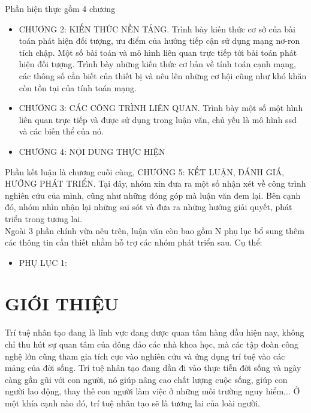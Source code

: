 \documentclass[a4paper]{report}
\begin{document}
Phần hiện thực gồm 4 chương\\
\begin{itemize}
	\item CHƯƠNG 2: KIẾN THỨC NỀN TẢNG. Trình bày kiến thức cơ sở của bài toán phát hiện
	 đối tượng, ưu điểm của hướng tiếp cận sử dụng mạng nơ-ron tích chập. Một số bài 
	 toán và mô hình liên quan trực tiếp tới bài toán phát hiện đối tượng. Trình bày 
	 những kiến thức cơ bản về tính toán cạnh mạng, các thông số cần biết của thiết bị
	  và nêu lên những cơ hội cũng như khó khăn còn tồn tại của tính toán mạng. 
	\item CHƯƠNG 3: CÁC CÔNG TRÌNH LIÊN QUAN. Trình bày một số một hình liên quan 
	trực tiếp và được sử dụng trong luận văn, chủ yếu là mô hình ssd và các biến thể 
	của nó.

	\item CHƯƠNG 4: NỘI DUNG THỰC HIỆN
\end{itemize}

Phần kết luận là chương cuối cùng, CHƯƠNG 5: KẾT LUẬN, ĐÁNH GIÁ, HƯỚNG PHÁT TRIỂN. Tại đây, nhóm xin đưa
ra một số nhận xét về công trình nghiên cứu của mình, cũng như những đóng góp mà luận
văn đem lại. Bên cạnh đó, nhóm nhìn nhận lại những sai sót và đưa ra những hướng giải
quyết, phát triển trong tương lai.\\

Ngoài 3 phần chính vừa nêu trên, luận văn còn bao gồm N phụ lục bổ sung thêm các
thông tin cần thiết nhằm hỗ trợ các nhóm phát triển sau. Cụ thể:
\begin{itemize}
	\item PHỤ LỤC 1:
\end{itemize}

\newpage %
\listoftables
\newpage
\listoffigures


\newpage
\tableofcontents
\newpage



\chapter{GIỚI THIỆU} 
Trí tuệ nhân tạo đang là lĩnh vực đang được quan tâm hàng đầu hiện nay,
không chỉ thu hút sự quan tâm của đông đảo các nhà khoa học, mà các tập đoàn
công nghệ lớn cũng tham gia tích cực vào nghiên cứu và ứng dụng trí tuệ vào các
mảng của đời sống. Trí tuệ nhân tạo đang dần đi vào thực tiễn đời sống và ngày
càng gần gũi với con người, nó giúp nâng cao chất lượng cuộc sống, giúp con người
lao động, thay thế con người làm việc ở những môi trường nguy hiểm,.. Ở một
khía cạnh nào đó, trí tuệ nhân tạo sẽ là tương lai của loài người.\\
\end{document}

